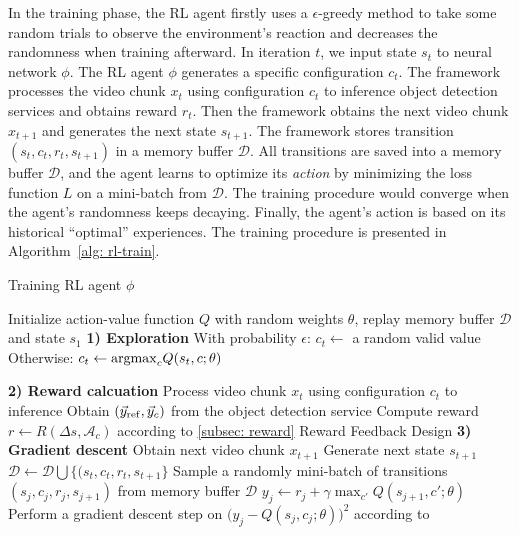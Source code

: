 In the training phase, the RL agent firstly uses a $\epsilon$-greedy method to take some random trials to observe the environment's reaction and decreases the randomness when training afterward. In iteration $t$, we input state $s_t $ to neural network $ \phi $. The RL agent $\phi$ generates a specific configuration $c_t$. The framework processes the video chunk $x_t$ using configuration $c_t$ to inference object detection services and obtains reward $r_t$. Then the framework obtains the next video chunk $x_{t+1}$ and generates the next state $ s_{t+1} $. The framework stores transition $(s_t, c_t, r_t, s_{t+1})$ in a memory buffer $\mathcal{D}$. All transitions are saved into a memory buffer $ \mathcal{D} $, and the agent learns to optimize its \emph{action} by minimizing the loss function $ L $ on a mini-batch from $ \mathcal{D} $. The training procedure would converge when the agent's randomness keeps decaying. Finally, the agent's action is based on its historical ``optimal'' experiences. The training procedure is presented in Algorithm~\ref{alg: rl-train}.

\setlength{\textfloatsep}{0.1cm}
\begin{algorithm}[!t]
		\caption{Training RL agent $ \phi $} %
		\label{alg: rl-train}
		\begin{algorithmic}[1]	
			\STATE Initialize action-value function $ Q $ with random weights $ \theta $, replay memory buffer $ \mathcal{D} $ and state $ s_1 $				
			\STATE \textbf{1) Exploration}
			\STATE With probability $\epsilon$:
			\STATE \hspace{1em} $c_t \leftarrow$ a random valid value 
			\STATE Otherwise:
			\STATE \hspace{1em} $ c_t \leftarrow {\rm argmax}_cQ(s_t, c; \theta) $ 

			\STATE \textbf{2) Reward calcuation} 
			\STATE Process video chunk $ x_t $ using configuration $ c_t $ to inference
			\STATE Obtain $ (\vec{y}_{\rm ref}, \vec{y}_c) $ from the object detection service
			\STATE Compute reward $ r \leftarrow R(\Delta s, \mathcal{A}_c) $ according to \ref{subsec: reward} Reward Feedback Design 
			\STATE \textbf{3) Gradient descent}
			\STATE Obtain next video chunk $ x_{t+1} $
			\STATE Generate next state $ s_{t+1} $
			\STATE $ \mathcal{D} \leftarrow \mathcal{D} \bigcup \{(s_t, c_t, r_t, s_{t+1} \} $
			\STATE Sample a randomly mini-batch of transitions $ (s_j, c_j, r_j, s_{j+1}) $ from memory buffer $ \mathcal{D} $
			\STATE $ y_j \leftarrow r_j + \gamma \max_{c'}Q(s_{j+1}, c'; \theta) $
			\STATE Perform a gradient descent step on $ \big(y_j - Q(s_j, c_j; \theta)\big)^2 $ according to~\cite{DQN}
			\ENDFOR
		\end{algorithmic}
\end{algorithm}
\setlength{\floatsep}{0.1cm}

